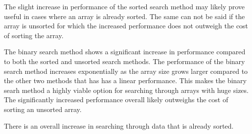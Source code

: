 \documentclass[a4paper,11pt]{article}
\begin{document}
The slight increase in performance of the sorted search method may
likely prove useful in cases where an array is already sorted. The 
same can not be said if the array is unsorted for which the increased
performance does not outweigh the cost of sorting the array.

The binary search method shows a significant increase in performance
compared to both the sorted and unsorted search methods. The 
performance of the binary search method increases exponentially as
the array size grows larger compared to the other two methods that has
has a linear performance. This makes the binary searh method a highly 
viable option for searching through arrays with huge sizes. The 
significantly increased performance overall likely outweighs the cost 
of sorting an unsorted array.

There is an overall increase in searching through data that is already
sorted.
\end{document}
